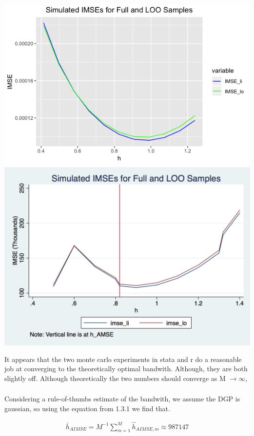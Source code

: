 \documentclass[12pt]{article}
\begin{document}
\includegraphics[totalheight=6cm]{rplot_hw2_q1.png}
\includegraphics[totalheight=6cm]{hw2q1_3.png}

It appears that the two monte carlo experiments in stata and r do a reasonable job at converging to the theoretically optimal bandwith. Although, they are both slightly off. Although theoretically the two numbers should converge as M $\rightarrow \infty$,


\subsubsection{}
Considering a rule-of-thumbs estimate of the bandwith, we assume the DGP is gaussian, so using the equation from 1.3.1 we find that.

\begin{gather*}
\bar{h}_{AIMSE} = M^{-1} \sum_{m=1}^M  \hat{h}_{AIMSE,m} \approx 987147
\end{gather*}
\end{document}
